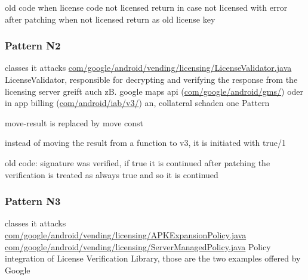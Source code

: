 
old code when license code not licensed return in case not licensed with error
after patching when not licensed return as old license key
\subsubsection{Pattern N2}
classes it attacks
\url{com/google/android/vending/licensing/LicenseValidator.java}
LicenseValidator, responsible for decrypting and verifying the response from the licensing server\cite{developersLicensingReference}
greift auch zB. google maps api (\url{com/google/android/gms/}) oder in app billing (\url{com/android/iab/v3/}) an, collateral schaden
one Pattern



move-result is replaced by move const



instead of moving the result from a function to v3, it is initiated with true/1



old code: signature was verified, if true it is continued
after patching the verification is treated as always true and so it is continued
\subsubsection{Pattern N3}
classes it attacks
\url{com/google/android/vending/licensing/APKExpansionPolicy.java}
\url{com/google/android/vending/licensing/ServerManagedPolicy.java}
Policy integration of License Verification Library, those are the two examples offered by Google\cite{developersLicensingReference}

